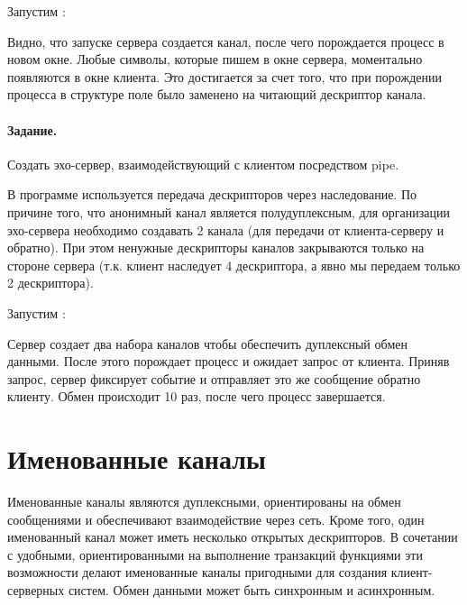 Запустим :





Видно, что запуске сервера создается канал, после чего порождается процесс  в новом окне. Любые символы, которые пишем в окне сервера, моментально появляются в окне клиента. Это достигается за счет того, что при порождении процесса в структуре  поле  было заменено на читающий дескриптор канала.

\paragraph{Задание.} Создать эхо-сервер, взаимодействующий с клиентом посредством pipe.

В программе используется передача дескрипторов через наследование. По причине того, что анонимный канал является полудуплексным, для организации эхо-сервера необходимо создавать 2 канала (для передачи от клиента-серверу и обратно). При этом ненужные дескрипторы каналов закрываются только на стороне сервера (т.к. клиент наследует 4 дескриптора, а явно мы передаем только 2 дескриптора).





Запустим :





Сервер создает два набора каналов чтобы обеспечить дуплексный обмен данными. После этого порождает процесс  и ожидает запрос от клиента. Приняв запрос, сервер фиксирует событие и отправляет это же сообщение обратно клиенту. Обмен происходит 10 раз, после чего процесс завершается.

\section{Именованные каналы}

Именованные каналы являются дуплексными, ориентированы на обмен сообщениями и обеспечивают взаимодействие через сеть. Кроме того, один именованный канал может иметь несколько открытых дескрипторов. В сочетании с удобными, ориентированными на выполнение транзакций функциями эти возможности делают именованные каналы пригодными для создания клиент-серверных систем. Обмен данными может быть синхронным и асинхронным.

